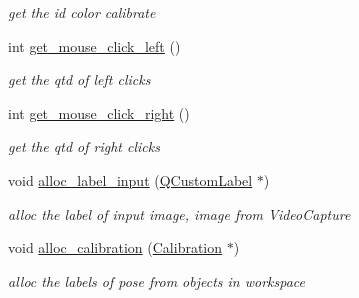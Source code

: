 \begin{DoxyCompactItemize}
\begin{DoxyCompactList}\small\item\em get the id color calibrate \end{DoxyCompactList}\item 
int \hyperlink{classcalibration_a45d0e76b3f360c7b198166cf7ccc638d}{get\+\_\+mouse\+\_\+click\+\_\+left} ()\hypertarget{classcalibration_a45d0e76b3f360c7b198166cf7ccc638d}{}\label{classcalibration_a45d0e76b3f360c7b198166cf7ccc638d}

\begin{DoxyCompactList}\small\item\em get the qtd of left clicks \end{DoxyCompactList}\item 
int \hyperlink{classcalibration_a8053c43e483faf127e20e16ff4ee6d8a}{get\+\_\+mouse\+\_\+click\+\_\+right} ()\hypertarget{classcalibration_a8053c43e483faf127e20e16ff4ee6d8a}{}\label{classcalibration_a8053c43e483faf127e20e16ff4ee6d8a}

\begin{DoxyCompactList}\small\item\em get the qtd of right clicks \end{DoxyCompactList}\item 
void \hyperlink{classcalibration_ab0b5f5514c665852aa63830121622518}{alloc\+\_\+label\+\_\+input} (\hyperlink{classQCustomLabel}{Q\+Custom\+Label} $\ast$)
\begin{DoxyCompactList}\small\item\em alloc the label of input image, image from Video\+Capture \end{DoxyCompactList}\item 
void \hyperlink{classcalibration_ac5e4cd1cead7176b0f34586112aaa918}{alloc\+\_\+calibration} (\hyperlink{structcommon_1_1Calibration}{Calibration} $\ast$)
\begin{DoxyCompactList}\small\item\em alloc the labels of pose from objects in workspace \end{DoxyCompactList}\end{DoxyCompactItemize}
